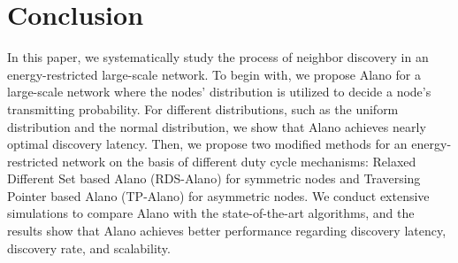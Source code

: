 \section{Conclusion}
\label{Conclusion}
In this paper, we systematically study the process of neighbor discovery
in an energy-restricted large-scale network. To begin with, we propose
Alano for a large-scale network where the nodes' distribution is utilized to
decide a node's transmitting probability. For different distributions,
such as the uniform distribution and the normal distribution, we show that Alano
achieves nearly optimal discovery latency. Then, we propose two modified
methods for an energy-restricted network on the basis of different duty
cycle mechanisms: Relaxed Different Set based Alano (RDS-Alano) for
symmetric nodes and Traversing Pointer based Alano (TP-Alano) for
asymmetric nodes. We conduct extensive simulations to compare Alano with
the state-of-the-art algorithms, and the results show that Alano achieves
better performance regarding discovery latency, discovery rate, and
scalability.%
